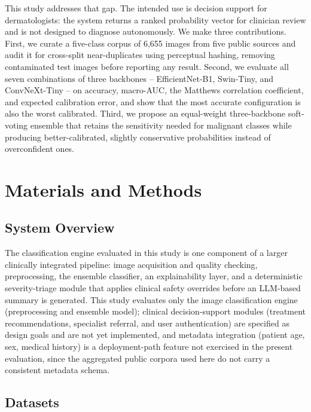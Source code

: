 \documentclass[VANCOUVER,twocolumn]{USG}
\begin{document}
This study addresses that gap. The intended use is decision support for
dermatologists: the system returns a ranked probability vector for
clinician review and is not designed to diagnose autonomously. We make
three contributions. First, we curate a five-class corpus of 6,655 images
from five public sources and audit it for cross-split near-duplicates
using perceptual hashing, removing contaminated test images before
reporting any result. Second, we evaluate all seven combinations of three
backbones -- EfficientNet-B1, Swin-Tiny, and ConvNeXt-Tiny -- on accuracy,
macro-AUC, the Matthews correlation coefficient, and expected calibration
error, and show that the most accurate configuration is also the worst
calibrated. Third, we propose an equal-weight three-backbone soft-voting
ensemble that retains the sensitivity needed for malignant classes while
producing better-calibrated, slightly conservative probabilities instead
of overconfident ones.

\section{Materials and Methods}\label{sec:methods}

\subsection{System Overview}

The classification engine evaluated in this study is one component of a
larger clinically integrated pipeline: image acquisition and quality
checking, preprocessing, the ensemble classifier, an explainability layer,
and a deterministic severity-triage module that applies clinical safety
overrides before an LLM-based summary is generated. This study evaluates
only the image classification engine (preprocessing and ensemble model);
clinical decision-support modules (treatment recommendations, specialist
referral, and user authentication) are specified as design goals and are
not yet implemented, and metadata integration (patient age, sex, medical
history) is a deployment-path feature not exercised in the present
evaluation, since the aggregated public corpora used here do not carry a
consistent metadata schema.

\subsection{Datasets}
\end{document}
